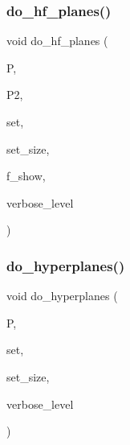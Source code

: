 \subsubsection{\texorpdfstring{do\+\_\+hf\+\_\+planes()}{do\_hf\_planes()}}
{\footnotesize\ttfamily void do\+\_\+hf\+\_\+planes (\begin{DoxyParamCaption}\item[{\mbox{\hyperlink{classprojective__space}{projective\+\_\+space}} $\ast$}]{P,  }\item[{\mbox{\hyperlink{classprojective__space}{projective\+\_\+space}} $\ast$}]{P2,  }\item[{\mbox{\hyperlink{galois_8h_a09fddde158a3a20bd2dcadb609de11dc}{I\+NT}} $\ast$}]{set,  }\item[{\mbox{\hyperlink{galois_8h_a09fddde158a3a20bd2dcadb609de11dc}{I\+NT}}}]{set\+\_\+size,  }\item[{\mbox{\hyperlink{galois_8h_a09fddde158a3a20bd2dcadb609de11dc}{I\+NT}}}]{f\+\_\+show,  }\item[{\mbox{\hyperlink{galois_8h_a09fddde158a3a20bd2dcadb609de11dc}{I\+NT}}}]{verbose\+\_\+level }\end{DoxyParamCaption})}

\mbox{\label{analyze_8_c_a1b317d157223e79e4363fcaee69de3dc}} 
\subsubsection{\texorpdfstring{do\+\_\+hyperplanes()}{do\_hyperplanes()}}
{\footnotesize\ttfamily void do\+\_\+hyperplanes (\begin{DoxyParamCaption}\item[{\mbox{\hyperlink{classprojective__space}{projective\+\_\+space}} $\ast$}]{P,  }\item[{\mbox{\hyperlink{galois_8h_a09fddde158a3a20bd2dcadb609de11dc}{I\+NT}} $\ast$}]{set,  }\item[{\mbox{\hyperlink{galois_8h_a09fddde158a3a20bd2dcadb609de11dc}{I\+NT}}}]{set\+\_\+size,  }\item[{\mbox{\hyperlink{galois_8h_a09fddde158a3a20bd2dcadb609de11dc}{I\+NT}}}]{verbose\+\_\+level }\end{DoxyParamCaption})}

\mbox{\label{analyze_8_c_a8a0ad1642efe3759982b81e0fa63f035}} 
